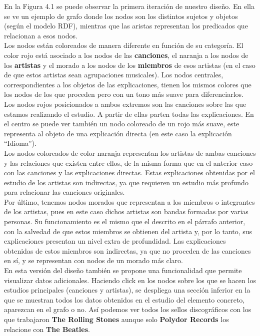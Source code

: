 En la Figura 4.1 se puede observar la primera iteración de nuestro diseño. En ella se ve un ejemplo de grafo donde los nodos son los distintos sujetos y objetos (según el modelo RDF), mientras que las aristas representan los predicados que relacionan a esos nodos.\\

Los nodos están coloreados de manera diferente en función de su categoría. El color rojo está asociado a los nodos de las \textbf{canciones}, el naranja a los nodos de los \textbf{artistas} y el morado a los nodos de los \textbf{miembros} de esos artistas (en el caso de que estos artistas sean agrupaciones musicales). Los nodos centrales, correspondientes a los objetos de las explicaciones, tienen los mismos colores que los nodos de los que proceden pero con un tono más suave para diferenciarlos.\\

Los nodos rojos posicionados a ambos extremos son las canciones sobre las que estamos realizando el estudio. A partir de ellas parten todas las explicaciones. En el centro se puede ver también un nodo coloreado de un rojo más suave, este representa al objeto de una explicación directa (en este caso la explicación ``Idioma'').\\

Los nodos coloreados de color naranja representan los artistas de ambas canciones y las relaciones que existen entre ellos, de la misma forma que en el anterior caso con las canciones y las explicaciones directas. Estas explicaciones obtenidas por el estudio de los artistas son indirectas, ya que requieren un estudio más profundo para relacionar las canciones originales.\\

Por último, tenemos nodos morados que representan a los miembros o integrantes de los artistas, pues en este caso dichos artistas son bandas formadas por varias personas. Su funcionamiento es el mismo que el descrito en el párrafo anterior, con la salvedad de que estos miembros se obtienen del artista y, por lo tanto, sus explicaciones presentan un nivel extra de profundidad. Las explicaciones obtenidas de estos miembros son indirectas, ya que no proceden de las canciones en sí, y se representan con nodos de un morado más claro.\\

En esta versión del diseño también se propone una funcionalidad que permite visualizar datos adicionales. Haciendo click en los nodos sobre los que se hacen los estudios principales (canciones y artistas), se despliega una sección inferior en la que se muestran todos los datos obtenidos en el estudio del elemento concreto, aparezcan en el grafo o no. Así podemos ver todos los sellos discográficos con los que trabajaron \textbf{The Rolling Stones} aunque solo \textbf{Polydor Records} los relacione con \textbf{The Beatles}.\\


